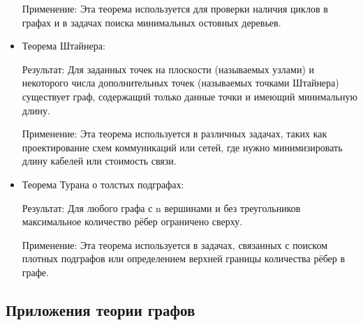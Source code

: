 \begin{itemize}
	Применение: Эта теорема используется для проверки наличия циклов в графах и в задачах поиска минимальных остовных деревьев.
	
	\item Теорема Штайнера:
	
	Результат: Для заданных точек на плоскости (называемых узлами) и некоторого числа дополнительных точек (называемых точками Штайнера) существует граф, содержащий только данные точки и имеющий минимальную длину.
	
	Применение: Эта теорема используется в различных задачах, таких как проектирование схем коммуникаций или сетей, где нужно минимизировать длину кабелей или стоимость связи.
	
	\item Теорема Турана о толстых подграфах:
	
	Результат: Для любого графа с n вершинами и без треугольников максимальное количество рёбер ограничено сверху.
	
	Применение: Эта теорема используется в задачах, связанных с поиском плотных подграфов или определением верхней границы количества рёбер в графе.
\end{itemize}

\subsection{Приложения теории графов}

